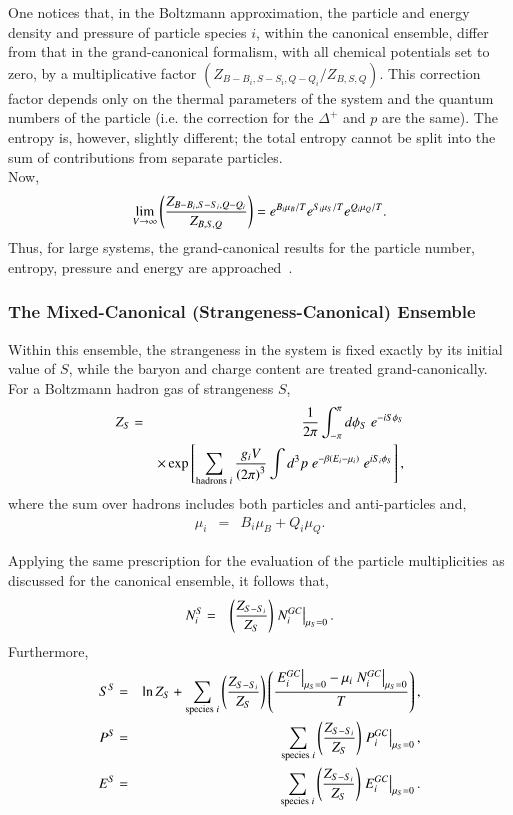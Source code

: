\documentclass{elsarticle}
\begin{document}
One notices that, in the Boltzmann approximation, the
particle and energy density and pressure of particle species $i$, within the
canonical ensemble, differ from that in the grand-canonical formalism, with all chemical 
potentials set to zero, by a multiplicative factor $\left({Z_{B-B_i,S-S_i,Q-Q_i}/Z_{B,S,Q}}\right)$. 
This correction factor depends only on the thermal parameters of the 
system and the quantum numbers of the particle (i.e. the correction for the 
$\Delta^+$ and $p$ are the same). The
entropy is, however, slightly different; the total entropy cannot be
split into the sum of contributions from separate particles.\\

Now, 
\begin{eqnarray}
  \lim_{V\rightarrow\infty}\left({Z_{B-B_i,S-S_i,Q-Q_i}\over
    Z_{B,S,Q}}\right) = e^{B_i\mu_B/T}e^{S_i\mu_S/T}e^{Q_i\mu_Q/T}.\label{Eq:Corr Factors}
  \end{eqnarray}
Thus, for large systems, the grand-canonical results for the particle number, entropy, 
pressure and energy are approached~\cite{Keranen:2001pr}.\\

\subsubsection{The Mixed-Canonical (Strangeness-Canonical) Ensemble}\label{SubSection::SCanonical}

Within this ensemble, the strangeness in the system is fixed exactly by its 
initial value of $S$, while the baryon and charge content are treated grand-canonically. 
For a Boltzmann hadron gas of strangeness $S$,
\begin{eqnarray}
Z_{S} &=& {1\over2\pi}\int_{-\pi}^{\pi}d\phi_S\;e^{-iS\phi_S}\nonumber\\
& & \times\exp\left[\sum_{\mathrm{hadrons}\;i}{g_iV\over\left(2\pi\right)^3}\int
d^3p\;e^{-\beta\left(
  E_i-\mu_i\right)}\;e^{iS_i\phi_S}\right],
\end{eqnarray}
where the sum over hadrons includes both particles and
anti-particles and,
\begin{eqnarray}
\mu_i &=& B_i\mu_B + Q_i\mu_Q.
\end{eqnarray}

Applying the same prescription for the evaluation of the particle multiplicities as discussed 
for the canonical ensemble, it follows that,
\begin{eqnarray}
  N_i^{S} &=& \left({Z_{S-S_i}\over
  Z_{S}}\right)\left.N_i^{GC}\right|_{\mu_S=0}.
\end{eqnarray}
Furthermore,
\begin{eqnarray}
  S^{S} &=& \ln Z_{S} + \sum_{\mathrm{species}\;i} \left({Z_{S-S_i}\over
    Z_{S}}\right)\left({\left.E_i^{GC}\right|_{\mu_S=0}-\mu_i\left.N_i^{GC}\right|_{\mu_S=0}\over T}\right),\\
  P^{S} &=&  \sum_{\mathrm{species}\;i} \left({Z_{S-S_i}\over
    Z_{S}}\right)\left.P_i^{GC}\right|_{\mu_S=0},\\
  E^{S} &=& \sum_{\mathrm{species}\;i} \left({Z_{S-S_i}\over
    Z_{S}}\right)\left.E_i^{GC}\right|_{\mu_S=0}.
\end{eqnarray}
\end{document}
